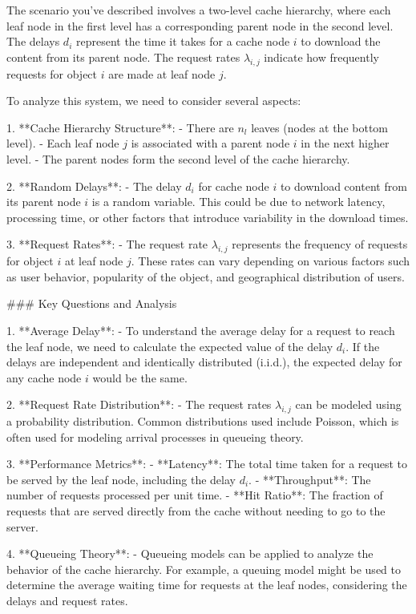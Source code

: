 The scenario you've described involves a two-level cache hierarchy, where each leaf node in the first level has a corresponding parent node in the second level. The delays \( d_i \) represent the time it takes for a cache node \( i \) to download the content from its parent node. The request rates \( \lambda_{i,j} \) indicate how frequently requests for object \( i \) are made at leaf node \( j \).

To analyze this system, we need to consider several aspects:

1. **Cache Hierarchy Structure**: 
   - There are \( n_l \) leaves (nodes at the bottom level).
   - Each leaf node \( j \) is associated with a parent node \( i \) in the next higher level.
   - The parent nodes form the second level of the cache hierarchy.

2. **Random Delays**:
   - The delay \( d_i \) for cache node \( i \) to download content from its parent node \( i \) is a random variable. This could be due to network latency, processing time, or other factors that introduce variability in the download times.

3. **Request Rates**:
   - The request rate \( \lambda_{i,j} \) represents the frequency of requests for object \( i \) at leaf node \( j \). These rates can vary depending on various factors such as user behavior, popularity of the object, and geographical distribution of users.

### Key Questions and Analysis

1. **Average Delay**:
   - To understand the average delay for a request to reach the leaf node, we need to calculate the expected value of the delay \( d_i \). If the delays are independent and identically distributed (i.i.d.), the expected delay for any cache node \( i \) would be the same.

2. **Request Rate Distribution**:
   - The request rates \( \lambda_{i,j} \) can be modeled using a probability distribution. Common distributions used include Poisson, which is often used for modeling arrival processes in queueing theory.

3. **Performance Metrics**:
   - **Latency**: The total time taken for a request to be served by the leaf node, including the delay \( d_i \).
   - **Throughput**: The number of requests processed per unit time.
   - **Hit Ratio**: The fraction of requests that are served directly from the cache without needing to go to the server.

4. **Queueing Theory**:
   - Queueing models can be applied to analyze the behavior of the cache hierarchy. For example, a queuing model might be used to determine the average waiting time for requests at the leaf nodes, considering the delays and request rates.

